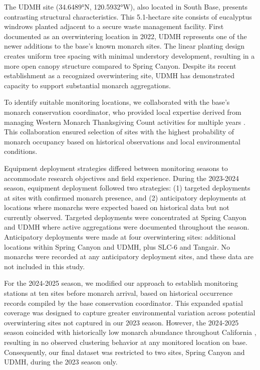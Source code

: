 The UDMH site (34.6489°N, 120.5932°W), also located in South Base, presents contrasting structural characteristics. This 5.1-hectare site consists of eucalyptus windrows planted adjacent to a secure waste management facility. First documented as an overwintering location in 2022, UDMH represents one of the newer additions to the base's known monarch sites. The linear planting design creates uniform tree spacing with minimal understory development, resulting in a more open canopy structure compared to Spring Canyon. Despite its recent establishment as a recognized overwintering site, UDMH has demonstrated capacity to support substantial monarch aggregations.

To identify suitable monitoring locations, we collaborated with the base's monarch conservation coordinator, who provided local expertise derived from managing Western Monarch Thanksgiving Count activities for multiple years \autocite{xercesGuideWesternMonarch2025}. This collaboration ensured selection of sites with the highest probability of monarch occupancy based on historical observations and local environmental conditions.


Equipment deployment strategies differed between monitoring seasons to accommodate research objectives and field experience. During the 2023-2024 season, equipment deployment followed two strategies: (1) targeted deployments at sites with confirmed monarch presence, and (2) anticipatory deployments at locations where monarchs were expected based on historical data but not currently observed. Targeted deployments were concentrated at Spring Canyon and UDMH where active aggregations were documented throughout the season. Anticipatory deployments were made at four overwintering sites: additional locations within Spring Canyon and UDMH, plus SLC-6 and Tangair. No monarchs were recorded at any anticipatory deployment sites, and these data are not included in this study.

For the 2024-2025 season, we modified our approach to establish monitoring stations at ten sites before monarch arrival, based on historical occurrence records compiled by the base conservation coordinator. This expanded spatial coverage was designed to capture greater environmental variation across potential overwintering sites not captured in our 2023 season. However, the 2024-2025 season coincided with historically low monarch abundance throughout California \autocite{xercesWesternMonarchThanksgiving2025}, resulting in no observed clustering behavior at any monitored location on base. Consequently, our final dataset was restricted to two sites, Spring Canyon and UDMH, during the 2023 season only.

